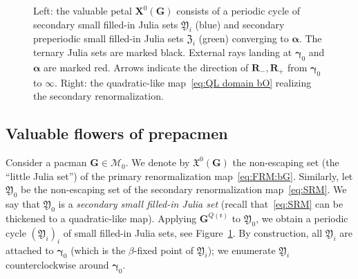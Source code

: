 \documentclass{amsart}
\newcommand{\1}{{\mathbb 1 }}
\newcommand\MM{\mathscr{M}}
\newcommand\bMM{{\pmb {\MM}}}
\newcommand\frakX{{\mathfrak X}}
\newcommand\frakY{{\mathfrak Y}}
\newcommand\frakZ{{\mathfrak Z}}
\newcommand{\bX}{{\mathbf X}}
\newcommand{\bR}{{\mathbf R}}
\newcommand{\bG}{{\mathbf G}}
\newcommand{\rr}{\mathfrak{r}}
\theoremstyle{remark}
\numberwithin{equation}{section}
\theoremstyle{definition}
\newcommand{\balpha}{{\boldsymbol \alpha}}
\newcommand{\bgamma}{{\boldsymbol{ \gamma}}}
\theoremstyle{nonumberbreak}
\begin{document}
\begin{figure}

\caption{Left: the valuable petal $\bX^0(\bG)$ consists of a periodic cycle of secondary small filled-in Julia sets $\frakY_i$ (blue) and secondary preperiodic small filled-in Julia sets $\frakZ_i$ (green) converging to $\balpha$. The ternary Julia sets are marked black. External rays landing at $\bgamma_0$ and $\balpha$ are marked red. Arrows indicate the direction of $\bR_-,\bR_+$ from $\bgamma_0$ to $\infty$. Right: the quadratic-like map~\eqref{eq:QL domain bO} realizing the secondary renormalization.}
\label{Fig:Val Flower X(G)}
\end{figure}


\subsection{Valuable flowers of prepacmen}
\label{ss:ValFlower:prep}
Consider a pacman $\bG\in \bMM_0$. We denote by $\frakX^0(\bG)$ the non-escaping set (the ``little Julia set'') of the primary renormalization map~\eqref{eq:FRM:bG}. Similarly, let $\frakY_0$ be the non-escaping set of the secondary renormalization map~\eqref{eq:SRM}. We say that $\frakY_0$ is a \emph{secondary small filled-in Julia set} (recall that~\eqref{eq:SRM} can be thickened to a quadratic-like map). Applying $\bG^{Q(\rr)}$ to $\frakY_0$, we obtain a periodic cycle $(\frakY_i)_{i}$ of small filled-in Julia sets, see Figure~\ref{Fig:Val Flower X(G)}. By construction, all $\frakY_i$ are attached to $\bgamma_0$ (which is the $\beta$-fixed point of $\frakY_i$); we enumerate $\frakY_i$ counterclockwise around $\bgamma_0$.
\end{document}
